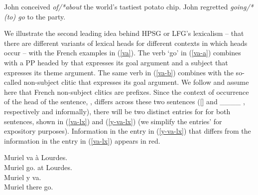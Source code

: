 \documentclass[output=paper]{langsci/langscibook}
\begin{document}
\begin{exe}
	\ex\label{select}
	\begin{xlist}
		\ex\label{select-a}John conceived \emph{of/*about} the world's tastiest potato chip.
		\ex\label{select-b} John regretted \emph{going/*(to) go} to the party.
	\end{xlist}
\end{exe} 


We illustrate the second leading idea behind HPSG or LFG's lexicalism  -- that there are different variants of lexical heads for different contexts in which heads occur -- with the French examples in (\ref{va}).  The verb  `go' in (\ref{va-a}) combines with a PP headed by  that expresses its goal argument and a subject that expresses its theme argument. The same verb in (\ref{va-b}) combines with the so-called non-subject clitic  that expresses its goal argument. We follow \citet{MillerandSag1997} and assume here that French non-subject clitics are prefixes. Since the context of occurrence of the head of the sentence, , differs across these two sentences ([] and  \_\_\_\_ , respectively and informally), there will be two distinct entries for  for both sentences, shown in (\ref{va-lx}) and (\ref{y-va-lx}) (we simplify the entries'  for expository purposes). Information in the entry in (\ref{y-va-lx}) that differs from the information in the entry in (\ref{va-lx}) appears in red.

\begin{exe}
	\ex\label{va}
	\begin{xlist}
		\ex\label{va-a} \gll Muriel va à Lourdes. \\
		Muriel go. at Lourdes. \\
		\ex\label{va-b} \gll Muriel y va. \\
		Muriel there go.\ig{pres.3rd.sg} \\
	\end{xlist}	
\end{exe}
\end{document}
